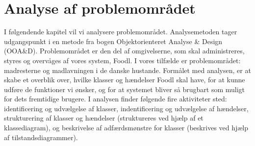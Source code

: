 \chapter{Analyse af problemområdet}
\label{chap:analyseafpo}

I følgendende kapitel vil vi analysere problemområdet. Analysemetoden tager udgangspunkt i en metode fra bogen Objektorienteret Analyse \& Design (OOA\&D)\cite[s. ~43]{ooad}. Problemområdet er den del af omgivelserne, som skal administreres, styres og overvåges af vores system, Foodl. I vores tilfælde er problemområdet: madresterne og madlavningen i de danske hustande. Formålet med analysen, er at skabe et overblik over, hvilke klasser og hændelser Foodl skal have, for at kunne udføre de funktioner vi ønsker, og for at systemet bliver så brugbart som muligt for dets fremtidige brugere. I analysen finder følgende fire aktiviteter sted: identificering og udvælgelse af klasser, indentificering og udvælgelse af hændelser, strukturering af klasser og hændelser (struktureres ved hjælp af et klassediagram), og beskrivelse af adfærdsmønstre for klasser (beskrives ved hjælp af tilstandsdiagrammer).  

 
            
        

